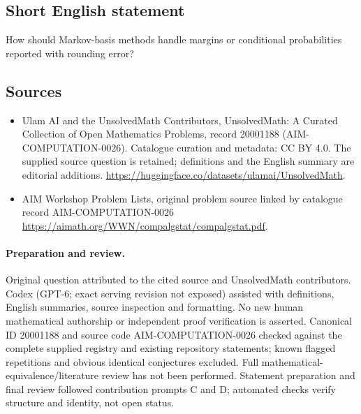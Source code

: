 \documentclass[11pt]{article}
\begin{document}
\subsection{Short English statement}
How should Markov-basis methods handle margins or conditional probabilities reported with rounding error?
\subsection{Sources}
\begin{itemize}
\item[\hypertarget{source:20001188:1}{S1}] Ulam AI and the UnsolvedMath Contributors, UnsolvedMath: A Curated Collection of Open Mathematics Problems, record 20001188 (AIM-COMPUTATION-0026). Catalogue curation and metadata: CC BY 4.0. The supplied source question is retained; definitions and the English summary are editorial additions.
\url{https://huggingface.co/datasets/ulamai/UnsolvedMath}.
\item[\hypertarget{source:20001188:2}{S2}] AIM Workshop Problem Lists, original problem source linked by catalogue record AIM-COMPUTATION-0026
\url{https://aimath.org/WWN/compalgstat/compalgstat.pdf}.
\end{itemize}
\paragraph{Preparation and review.}
Original question attributed to the cited source and UnsolvedMath contributors. Codex (GPT-6; exact serving revision not exposed) assisted with definitions, English summaries, source inspection and formatting. No new human mathematical authorship or independent proof verification is asserted. Canonical ID 20001188 and source code AIM-COMPUTATION-0026 checked against the complete supplied registry and existing repository statements; known flagged repetitions and obvious identical conjectures excluded. Full mathematical-equivalence/literature review has not been performed. Statement preparation and final review followed contribution prompts C and D; automated checks verify structure and identity, not open status.
\label{end:20001188}
\end{document}
